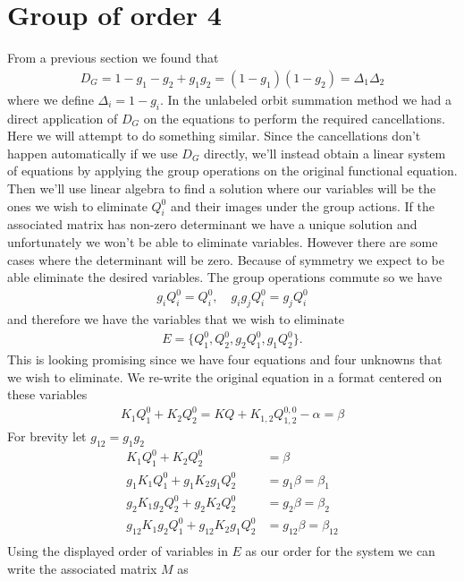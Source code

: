 \section{Group of order 4}
From a previous section we found that
\begin{align}
	D_G = 1-g_1-g_2+g_1g_2 = (1-g_1)(1-g_2) = \Delta_1\Delta_2
\end{align}
where we define $\Delta_i = 1- g_i$. In the unlabeled orbit summation method we had a direct application of $D_G$ on the equations to perform the required cancellations. Here we will attempt to do something similar. Since the cancellations don't happen automatically if we use $D_G$ directly, we'll instead obtain a linear system of equations by applying the group operations on the original functional equation. Then we'll use linear algebra to find a solution where our variables will be the ones we wish to eliminate $Q_i^0$ and their images under the group actions. If the associated matrix has non-zero determinant we have a unique solution and unfortunately we won't be able to eliminate variables. However there are some cases where the determinant will be zero. Because of symmetry we expect to be able eliminate the desired variables. The group operations commute so we have
\begin{align}
	g_i Q_i^0 = Q_i^0,\quad g_ig_j Q_i^0 = g_j Q_i^0
\end{align}
and therefore we have the variables that we wish to eliminate
\begin{align}
	E = \{Q_1^0,Q_2^0,g_2Q_1^0,g_1Q_2^0\}.
\end{align}
This is looking promising since we have four equations and four unknowns that we wish to eliminate. We re-write the original equation in a format centered on these variables
\begin{align}
	 K_1 Q_1^0 +  K_2 Q_2^0 = KQ + K_{1,2}Q_{1,2}^{0,0} -\alpha = \beta
\end{align}
For brevity let $g_{12} = g_1g_2$
\begin{align}
	 K_1 Q_1^0 +  K_2 Q_2^0 &= \beta\\
	 g_1K_1 Q_1^0 + g_1K_2 g_1Q_2^0 &= g_1\beta = \beta_1\\
	 g_2K_1 g_2Q_2^0 + g_2K_2 Q_2^0 &= g_2\beta = \beta_2\\
	 g_{12}K_1 g_2Q_1^0 + g_{12}K_2 g_1Q_2^0 &= g_{12}\beta = \beta_{12}\\
\end{align}
Using the displayed order of variables in $E$ as our order for the system we can write the associated matrix $M$ as
